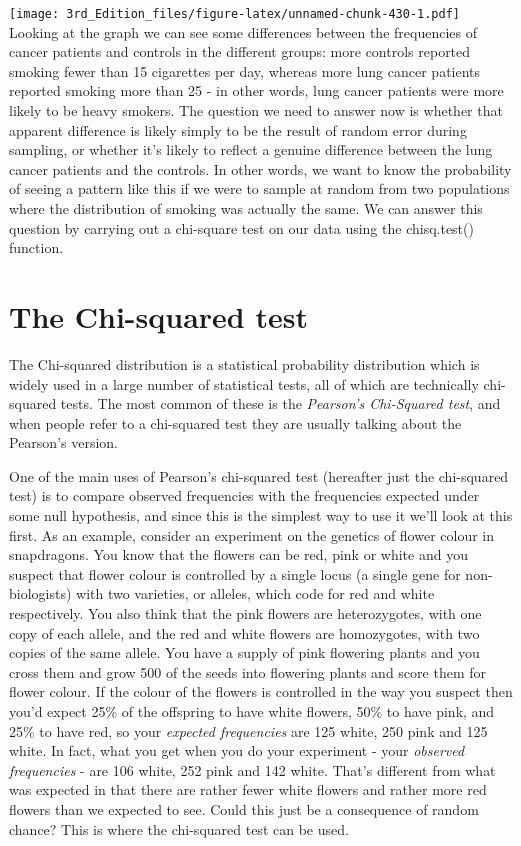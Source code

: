 \documentclass[
]{book}
\begin{document}
\texttt{[image: 3rd\_Edition\_files/figure-latex/unnamed-chunk-430-1.pdf]}
Looking at the graph we can see some differences between the frequencies of cancer patients and controls in the different groups: more controls reported smoking fewer than 15 cigarettes per day, whereas more lung cancer patients reported smoking more than 25 - in other words, lung cancer patients were more likely to be heavy smokers. The question we need to answer now is whether that apparent difference is likely simply to be the result of random error during sampling, or whether it's likely to reflect a genuine difference between the lung cancer patients and the controls. In other words, we want to know the probability of seeing a pattern like this if we were to sample at random from two populations where the distribution of smoking was actually the same. We can answer this question by carrying out a chi-square test on our data using the chisq.test() function.

\hypertarget{the-chi-squared-test}{%
\section{The Chi-squared test}\label{the-chi-squared-test}}

The Chi-squared distribution is a statistical probability distribution which is widely used in a large number of statistical tests, all of which are technically chi-squared tests. The most common of these is the \emph{Pearson's Chi-Squared test}, and when people refer to a chi-squared test they are usually talking about the Pearson's version.

One of the main uses of Pearson's chi-squared test (hereafter just the chi-squared test) is to compare observed frequencies with the frequencies expected under some null hypothesis, and since this is the simplest way to use it we'll look at this first. As an example, consider an experiment on the genetics of flower colour in snapdragons. You know that the flowers can be red, pink or white and you suspect that flower colour is controlled by a single locus (a single gene for non-biologists) with two varieties, or alleles, which code for red and white respectively. You also think that the pink flowers are heterozygotes, with one copy of each allele, and the red and white flowers are homozygotes, with two copies of the same allele. You have a supply of pink flowering plants and you cross them and grow 500 of the seeds into flowering plants and score them for flower colour. If the colour of the flowers is controlled in the way you suspect then you'd expect 25\% of the offspring to have white flowers, 50\% to have pink, and 25\% to have red, so your \emph{expected frequencies} are 125 white, 250 pink and 125 white. In fact, what you get when you do your experiment - your \emph{observed frequencies} - are 106 white, 252 pink and 142 white. That's different from what was expected in that there are rather fewer white flowers and rather more red flowers than we expected to see. Could this just be a consequence of random chance? This is where the chi-squared test can be used.
\end{document}
